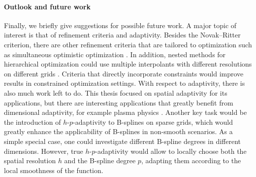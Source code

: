 \vspace*{\fill}

\paragraph{Outlook and future work}

Finally, we briefly give suggestions for possible future work.
A major topic of interest is that of refinement criteria and adaptivity.
Besides the Novak--Ritter criterion,
there are other refinement criteria that are tailored to optimization
such as simultaneous optimistic optimization \cite{Wang14Bayesian}.
In addition, nested methods for hierarchical optimization could
use multiple interpolants with different resolutions
on different grids \cite{Delbos14Global}.
Criteria that directly incorporate constraints would improve
results in constrained optimization settings.
With respect to adaptivity,
there is also much work left to do.
This thesis focused on spatial adaptivity for its applications,
but there are interesting applications
that greatly benefit from dimensional adaptivity,
for example plasma physics \cite{Pflueger14EXAHD}.
Another key task would be the introduction of
$h$-$p$-adaptivity to B-splines on sparse grids,
which would greatly enhance the applicability of B-splines in
non-smooth scenarios.
As a simple special case,
one could investigate different B-spline degrees in different dimensions.
However, true $h$-$p$-adaptivity would allow to locally choose
both the spatial resolution $h$ and the B-spline degree $p$,
adapting them according to the local smoothness of the function.

\pagebreak


